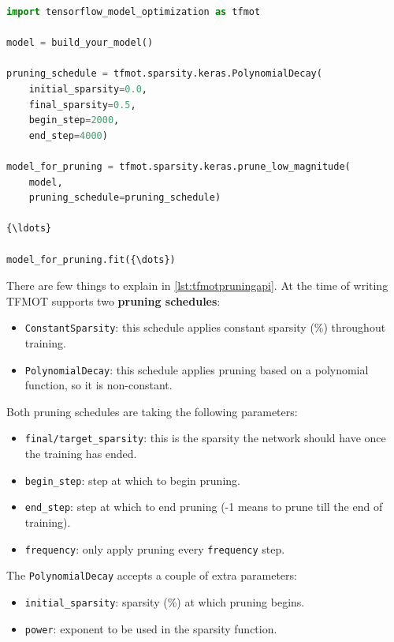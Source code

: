 \begin{lstlisting}[language=Python, label={lst:tfmotpruningapi},
    caption=Pruning API in TFMOT]
import tensorflow_model_optimization as tfmot

model = build_your_model()

pruning_schedule = tfmot.sparsity.keras.PolynomialDecay(
    initial_sparsity=0.0,
    final_sparsity=0.5,
    begin_step=2000,
    end_step=4000)

model_for_pruning = tfmot.sparsity.keras.prune_low_magnitude(
    model,
    pruning_schedule=pruning_schedule)

{\ldots}

model_for_pruning.fit({\dots})
\end{lstlisting}

There are few things to explain in \autoref{lst:tfmotpruningapi}. At the time
of writing TFMOT supports two \textbf{pruning schedules}:

\begin{itemize}
    \item \texttt{ConstantSparsity}: this schedule applies constant sparsity
        (\%) throughout training.
    \item \texttt{PolynomialDecay}: this schedule applies pruning based on a
        polynomial function, so it is non-constant.
\end{itemize}

Both pruning schedules are taking the following parameters:

\begin{itemize}
    \item \texttt{final/target\_sparsity}: this is the sparsity the network
        should have once the training has ended.
    \item \texttt{begin\_step}: step at which to begin pruning.
    \item \texttt{end\_step}: step at which to end pruning (-1 means to prune
        till the end of training).
    \item \texttt{frequency}: only apply pruning every \texttt{frequency} step.
\end{itemize}

The \texttt{PolynomialDecay} accepts a couple of extra parameters:

\begin{itemize}
    \item \texttt{initial\_sparsity}: sparsity (\%) at which pruning begins.
    \item \texttt{power}: exponent to be used in the sparsity function.
\end{itemize}

